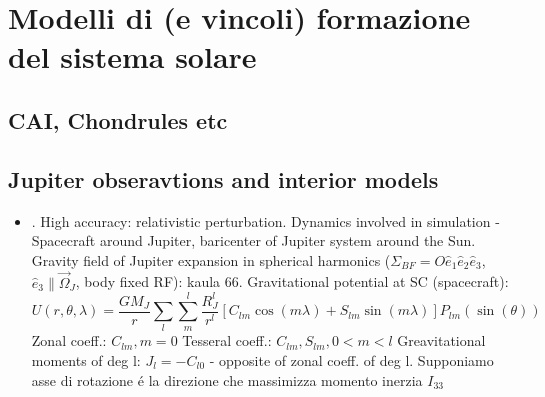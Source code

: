 \documentclass[main.tex]{subfiles}
\begin{document}
\newrefcontext[sorting=hot]

{\let\clearpage\relax
\chapter{Modelli di (e vincoli) formazione del sistema solare}
}

\begin{refsection}
\begingroup
\nocite{*}
\let\clearpage\relax
\printbibliography[filter={pps},heading=bibintoc,title={\textcolor{antiquefuchsia}{Vincoli a formazione planetaria da modelli/osservazioni formazione sistema solare}}]
\printbibliography[filter={pps},check=bibsearchdef,heading=bibintoc,title={\textcolor{antiquefuchsia}{Bib research}}]
\endgroup
\end{refsection}

\section{CAI, Chondrules etc}

\section{Jupiter obseravtions and interior models}

\begin{itemize}
    \item \cite{serra2016gravimetry}. High accuracy: relativistic perturbation. Dynamics involved in simulation - Spacecraft around Jupiter, baricenter of Jupiter system around the Sun. Gravity field of Jupiter expansion in spherical harmonics ($\Sigma_{BF}=O\hat{e}_1\hat{e}_2\hat{e}_3$, $\hat{e}_3\parallel\vec{\Omega}_J$,  body fixed RF): kaula 66. Gravitational potential at SC (spacecraft):
    \begin{equation*}
    U(r,\theta,\lambda)=\frac{GM_J}{r}\sum_l\sum_m^l\frac{R_J^l}{r^l}[C_{lm}\cos{(m\lambda)}+S_{lm}\sin{(m\lambda)}]P_{lm}(\sin{(\theta)})
    \end{equation*}
    Zonal coeff.: $C_{lm}, m=0$
    Tesseral coeff.: $C_{lm}, S_{lm}, 0<m<l$
    Greavitational moments of deg l: $J_l=-C_{l0}$ - opposite of zonal coeff. of deg l.
    Supponiamo asse di rotazione \'e la direzione che massimizza momento inerzia $I_{33}$
\end{itemize}
\end{document}
